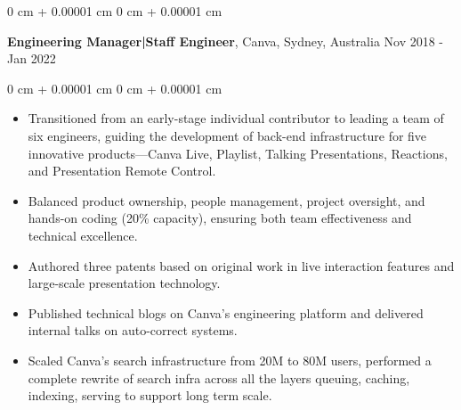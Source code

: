 \documentclass[10pt, letterpaper]{article}
\newenvironment{highlights}{
    \begin{itemize}[
        topsep=0.10 cm,
        parsep=0.10 cm,
        partopsep=0pt,
        itemsep=0pt,
        leftmargin=0 cm + 10pt
    ]
}{
    \end{itemize}
} %
\newenvironment{onecolentry}{
    \begin{adjustwidth}{
        0 cm + 0.00001 cm
    }{
        0 cm + 0.00001 cm
    }
}{
    \end{adjustwidth}
} %
\newenvironment{twocolentry}[2][]{
    \onecolentry
    \def\secondColumn{#2}
    \setcolumnwidth{\fill, 4.5 cm}
    \begin{paracol}{2}
}{
    \switchcolumn \raggedleft \secondColumn
    \end{paracol}
    \endonecolentry
} %
\begin{document}
        \vspace{0.15 cm}

        \begin{twocolentry}{
            Nov 2018 - Jan 2022
        }
            \textbf{Engineering Manager|Staff Engineer}, Canva, Sydney, Australia\end{twocolentry}

        \vspace{0.10 cm}
        \begin{onecolentry}
            \begin{highlights}
                \item Transitioned from an early-stage individual contributor to leading a team of six engineers, guiding the development of back-end infrastructure for five innovative products—Canva Live, Playlist, Talking Presentations, Reactions, and Presentation Remote Control.
                \item Balanced product ownership, people management, project oversight, and hands-on coding (20\% capacity), ensuring both team effectiveness and technical excellence.
                \item Authored three patents based on original work in live interaction features and large-scale presentation technology.
                \item Published technical blogs on Canva's engineering platform and delivered internal talks on auto-correct systems.
                \item Scaled Canva's search infrastructure from 20M to 80M users, performed a complete rewrite of search infra across all the layers queuing, caching, indexing, serving to support long term scale.
            \end{highlights}
        \end{onecolentry}
\end{document}
